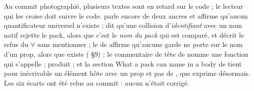Au commit photographié, plusieurs textes sont en retard sur le code ; le lecteur qui les croise doit suivre le code.  parle encore de deux ancres et affirme qu'aucun quantificateur universel n'existe ;  dit qu'une collision d'\emph{identifiant} avec un nom natif rejette le pack, alors que c'est le \emph{nom du pack} qui est comparé, et décrit le refus du $\forall$ sans mentionner  ; le  de  affirme qu'aucune garde ne porte sur le nom d'un prop, alors que  existe ( §9) ; le commentaire de tête de  nomme une fonction  qui s'appelle  ;  produit \og {}\fg{} ; et la section \og What a pack can name in a body\fg{} de  tient pour inécrivable \og un élément hôte avec un prop  et pas de \fg{}, que  exprime désormais. Les six écarts ont été relus au commit \snapshotCommit{} : aucun n'était corrigé.

